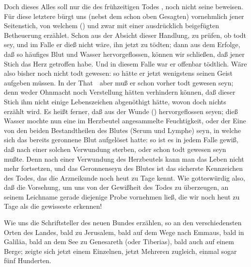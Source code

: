 \begin{aufza}
\begin{aufzb}
\begin{aufzc}
\item Doch dieses Alles soll nur die  des frühzeitigen Todes , noch nicht seine  beweisen. Für diese letztere bürgt uns (nebst dem schon oben Gesagten) vornehmlich jener Seitenstich, von welchem  () und zwar mit einer ausdrücklich beigefügten Betheuerung erzählet. Schon aus der Absicht dieser Handlung, zu prüfen, ob  todt sey, und im Falle er dieß nicht wäre, ihn jetzt zu tödten; dann aus dem Erfolge, daß so häufiges Blut und Wasser hervorgeflossen, können wir schließen, daß jener Stich das Herz getroffen habe. Und in diesem Falle war er offenbar tödtlich. Wäre also  bisher noch nicht todt gewesen: so hätte er jetzt wenigstens seinen Geist aufgeben müssen. In der That~\ aber muß er schon vorher todt gewesen seyn; denn weder Ohnmacht noch Verstellung hätten verhindern können, daß dieser Stich ihm nicht einige Lebenszeichen abgenöthigt hätte, wovon doch nichts erzählt wird. Es heißt ferner, daß aus der Wunde  () hervorgeflossen seyen; dieß Wasser mochte nun eine im Herzbeutel angesammelte Feuchtigkeit, oder der Eine von den beiden Bestandtheilen des Blutes (Serum und Lymphe) seyn, in welche sich das bereits geronnene Blut aufgelöset hatte: so ist es in jedem Falle gewiß, daß  nach einer solchen Verwundung sterben, oder schon todt gewesen seyn mußte. Denn nach einer Verwundung des Herzbeutels kann man das Leben nicht mehr fortsetzen, und das Geronnenseyn des Blutes ist das sicherste Kennzeichen des Todes, das die Arzneikunde noch heut zu Tage kennt. Wie gotteswürdig also, daß die Vorsehung, um uns von der Gewißheit des Todes  zu überzeugen, an seinem Leichname gerade diejenige Probe vornehmen ließ, die wir noch heut zu Tage als die gewisseste erkennen!
\end{aufzc}
\item {}
\begin{aufzc}
\item Wie uns die Schriftsteller des neuen Bundes erzählen, so  an den verschiedensten Orten des Landes, bald zu Jerusalem, bald auf dem Wege nach Emmaus, bald in Galiläa, bald an dem See zu Genesareth (oder Tiberias), bald auch auf einem Berge; zeigte sich jetzt einem Einzelnen, jetzt Mehreren zugleich, einmal sogar fünf Hunderten.

\end{aufzc}
\end{aufzb}
\end{aufza}
